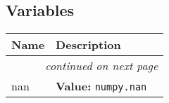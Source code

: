 
  \subsection{Variables}

    \vspace{-1cm}
\hspace{\varindent}\begin{longtable}{|p{\varnamewidth}|p{\vardescrwidth}|l}
\cline{1-2}
\cline{1-2} \centering \textbf{Name} & \centering \textbf{Description}& \\
\cline{1-2}
\endhead\cline{1-2}\multicolumn{3}{r}{\small\textit{continued on next page}}\\\endfoot\cline{1-2}
\endlastfoot\raggedright n\-a\-n\- & \raggedright \textbf{Value:} 
{\tt numpy.nan}&\\
\cline{1-2}
\end{longtable}

